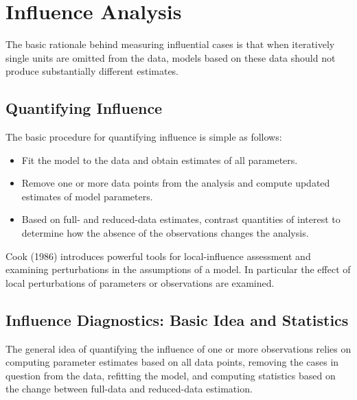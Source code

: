 \documentclass[12pt, a4paper]{report}
\begin{document}
\section*{Influence Analysis}
The basic rationale behind measuring influential cases is that when iteratively single units are omitted
from the data, models based on these data should not produce substantially different estimates.

\subsection{Quantifying Influence}  %

The basic procedure for quantifying influence is simple as follows:

\begin{itemize}
	\item Fit the model to the data and obtain estimates of all parameters.
	\item Remove one or more data points from the analysis and compute updated estimates of model parameters.
	\item Based on full- and reduced-data estimates, contrast quantities of interest to determine how the absence of the observations changes the analysis.
\end{itemize}

Cook (1986) introduces powerful tools for local-influence assessment and examining perturbations in the assumptions of a model. In particular the effect of local perturbations of parameters or observations are examined.	

\subsection{Influence Diagnostics: Basic Idea and Statistics} %

	


The general idea of quantifying the influence of one or more observations relies on computing parameter estimates based on all data points, removing the cases in question from the data, refitting the model, and computing statistics based on the change between full-data and reduced-data estimation. 
\end{document}
